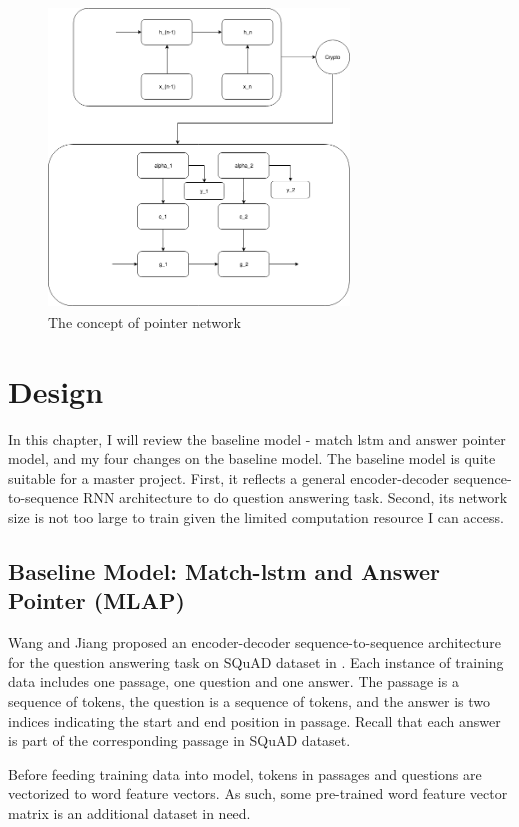 \documentclass[modernstyle,12pt]{sjsuthesis}
\theoremstyle{definition}
\begin{document}
\begin{figure}[htbp]\centering
  \includegraphics[width=8cm, height=8cm]{figures/pointerNetwork.png}
  \caption{The concept of pointer network}
  \label{f:pointerNetwork}
\end{figure}


\chapter{Design}\label{chap:design}

In this chapter, I will review the baseline model - match lstm and answer pointer model, and my four changes on the baseline model. The baseline model is quite suitable for a master project. First, it reflects a general encoder-decoder sequence-to-sequence RNN architecture to do question answering task. Second, its network size is not too large to train given the limited computation resource I can access.


\section{Baseline Model: Match-lstm and Answer Pointer (MLAP) }

Wang and Jiang  proposed an encoder-decoder sequence-to-sequence architecture for the question answering task on SQuAD dataset in \cite{wang2016machine}. Each instance of training data includes one passage, one question and one answer. The passage is a sequence of tokens, the question is a sequence of tokens, and the answer is two indices indicating the start and end position in passage. Recall that each answer is part of the corresponding passage in SQuAD dataset.

Before feeding training data into model, tokens in passages and questions are vectorized to word feature vectors. As such, some pre-trained word feature vector matrix is an additional dataset in need.
\end{document}
